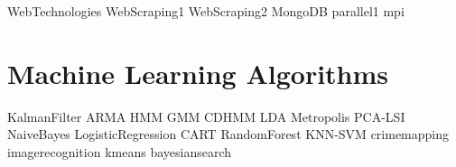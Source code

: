 \documentclass[opener-c,labs,yellow,nociteref]{HJnewsiambook}
\begin{document}
{WebTechnologies}
{WebScraping1}
{WebScraping2}
{MongoDB}
{parallel1}
{mpi}

\part{Machine Learning Algorithms} %
{KalmanFilter}
{ARMA}
{HMM}
{GMM}
{CDHMM}
{LDA}
{Metropolis}
{PCA-LSI}
{NaiveBayes}
{LogisticRegression}
{CART}
{RandomForest}
{KNN-SVM}
{crimemapping}
{imagerecognition}
{kmeans}
{bayesiansearch}
\end{document}
